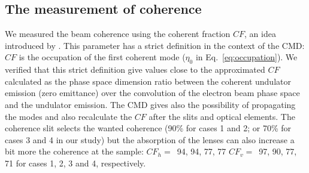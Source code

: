 \documentclass{iucr}              %
\newcommand{\todo}[1]{{\color{red}[TODO: "#1'']}}
\begin{document}


\subsection{The measurement of coherence} We measured the beam coherence using the coherent fraction $CF$, an idea introduced by . This parameter has a strict definition in the context of the CMD: $CF$ is the occupation of the first coherent mode ($\eta_0$ in Eq.~\ref{eq:occupation}). We verified that this strict definition give values close to the approximated $CF$ calculated as the phase space dimension ratio between the coherent undulator emission (zero emittance) over the convolution of the electron beam phase space and the undulator emission. The CMD gives also the possibility of propagating the modes and also recalculate the $CF$ after the slits and optical elements. The coherence slit selects the wanted coherence (90\% for cases 1 and 2; or 70\% for cases 3 and 4 in our study) but the absorption of the lenses can also increase a bit more the coherence at the sample: $CF_h=$~94, 94, 77, 77 $CF_v=$~97, 90, 77, 71 for cases 1, 2, 3 and 4, respectively. 
\end{document}
